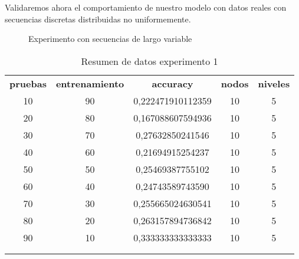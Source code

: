 	
	Validaremos ahora el comportamiento de nuestro modelo con datos reales con secuencias discretas distribuidas no uniformemente.
	
	
	
	\begin{figure}[h] 
		\centering
		\caption{Experimento con secuencias de largo variable}
		\label{fig:experimento2}
	\end{figure}
	

	\begin{table}[h]
		\centering
		\label{tabla-exp-1}
		\begin{tabular}{ccccc}
			\textbf{pruebas}     & \textbf{entrenamiento} & \textbf{accuracy}    & \textbf{nodos}       & \textbf{niveles}     \\
			10                   & 90                     & 0,222471910112359    & 10                   & 5                    \\
			20                   & 80                     & 0,167088607594936    & 10                   & 5                    \\
			30                   & 70                     & 0,27632850241546     & 10                   & 5                    \\
			40                   & 60                     & 0,21694915254237     & 10                   & 5                    \\
			50                   & 50                     & 0,25469387755102     & 10                   & 5                    \\
			60                   & 40                     & 0,24743589743590   	 & 10                   & 5                    \\
			70                   & 30                     & 0,255665024630541    & 10                   & 5                    \\
			80                   & 20                     & 0,263157894736842    & 10                   & 5                    \\
			90                   & 10                     & 0,333333333333333    & 10                   & 5                    \\
			&                        &                      &                      &                      \\
			\multicolumn{1}{l}{} & \multicolumn{1}{l}{}   & \multicolumn{1}{l}{} & \multicolumn{1}{l}{} & \multicolumn{1}{l}{}
		\end{tabular}
		\caption{ Resumen de datos experimento 1}
	\end{table}



